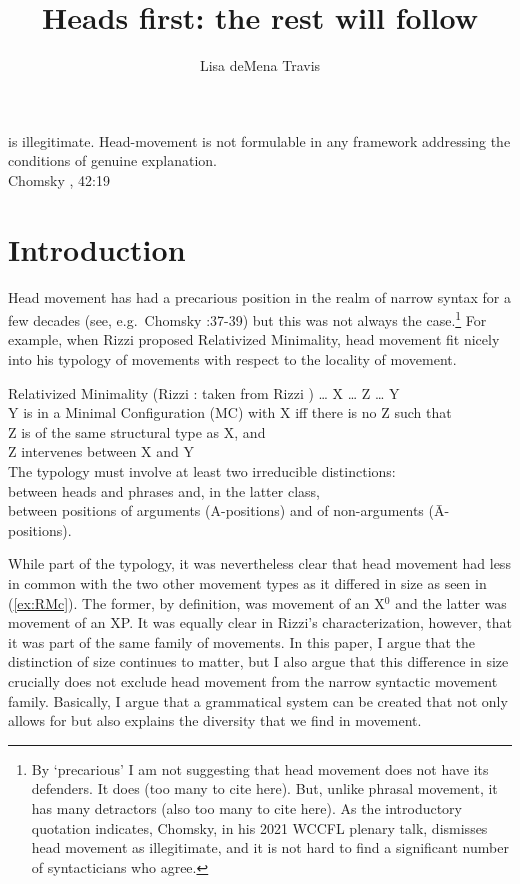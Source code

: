 \documentclass[output=paper,colorlinks,citecolor=brown,
]{langscibook}
\author{Lisa deMena Travis\affiliation{McGill University}\orcid{}}
\title{Heads first: the rest will follow}
\begin{document}
\maketitle


\vspace{1cm}
 is illegitimate.  Head-movement is not formulable in any framework addressing the conditions of genuine explanation.\\
 \hspace*{\fill} Chomsky \citeyear{Chomsky:2021}, 42:19

\section{Introduction}

Head movement has had a precarious position in the realm of narrow syntax for a few decades (see, e.g.\ Chomsky \citeyear{Chomsky:2001a}:37-39) but this was not always the case.\footnote{By `precarious'  I am not suggesting that  head movement does not have its defenders.  It does (too many to cite here).  But, unlike phrasal movement, it has many detractors (also too many to cite here).  As the introductory quotation indicates, Chomsky, in his 2021 WCCFL plenary talk, dismisses head movement as illegitimate, and it is not hard to find a significant number of syntacticians who agree.} For example, when Rizzi proposed Relativized Minimality, head movement fit nicely into his typology of movements with respect to the locality of movement.  

\ea Relativized Minimality (Rizzi \citeyear{Rizzi:1990}: taken from Rizzi \citeyear{Rizzi:2001a})
    \ea \ldots{} X \ldots{} Z \ldots{} Y\\
    \ex Y is in a Minimal Configuration (MC) with X iff there is no Z such that\\
        \ea Z is of the same structural type as X, and\\
        \ex Z intervenes between X and Y\\
        \z
    \ex The typology must involve at least two irreducible\label{ex:RMc}
    distinctions:\\
        \ea between heads and phrases and, in the latter class,\\
        \ex between positions of arguments (A-positions) and of non-arguments
    (\=A-positions).
        \z
    \z
\z

\noindent 
While part of the typology, it was nevertheless clear that head movement had less in common with the two other movement types as it differed in size as seen in (\ref{ex:RMc}). The former, by definition, was movement of an X$^0$ and the latter was movement of an XP.  It was equally clear in Rizzi's characterization, however, that it was part of the same family of movements.  In this paper, I argue that the distinction of size continues to matter, but I also argue that this difference in size crucially does  not exclude head movement from the narrow syntactic movement family.  Basically, I argue that a grammatical system can be created that not only allows for but also explains the diversity that we find in movement.
\end{document}
